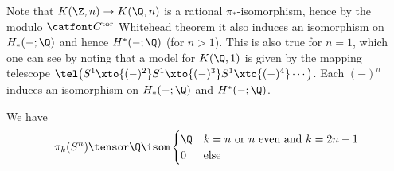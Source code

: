 \begin{remark}
	Note that $K(\Z, n) \to K(\Q, n)$ is a rational $\pi_*$-isomorphism, hence by the modulo $\Ctor$ Whitehead theorem it also induces an isomorphism on $H_*({{-}}; \Q)$ and hence $H^*({{-}}; \Q)$ (for $n > 1$).
	This is also true for $n = 1$, which one can see by noting that a model for $K(\Q, 1)$ is given by the mapping telescope $\tel\big(S^1 \xto{({{-}})^2} S^1 \xto{({{-}})^3} S^1 \xto{({{-}})^4} \cdots \big)$.
	Each $({{-}})^n$ induces an isomorphism on $H_*({{-}}; \Q)$ and $H^*({{-}}; \Q)$.
\end{remark}
\begin{theorem}\label{thm:rationalhomotopyofspheres}
	We have
	\begin{equation*}
		\pi_k(S^n) \tensor \Q \isom \begin{cases}
			\Q 	& k = n \text{ or } n \text{ even and } k = 2n - 1 \\
			0 	& \text{else}
		\end{cases}
	\end{equation*}
\end{theorem}
